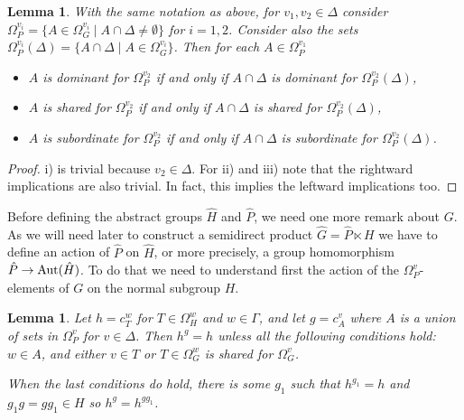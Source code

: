 \documentclass[10pt]{amsart}
\newtheorem{lemma}[theorem]{Lemma}
\theoremstyle{definition}
\newcommand{\Aut}{{\rm Aut}}
\theoremstyle{definition}
\numberwithin{equation}{section}
\begin{document}
\begin{lemma}\label{lem:intersection} With the same notation as above, for $v_1,v_2\in\Delta$ consider $\Omega_P^{v_i}=\{A\in\Omega_G^{v_i}\mid  A\cap\Delta \neq \emptyset\}$ for $i=1,2$.
Consider also the sets $\Omega_P^{v_i}(\Delta)=\{A\cap\Delta\mid A\in\Omega_G^{v_i}\}$.
 Then for each $A\in\Omega_P^{v_1}$
\begin{itemize}
\item[i)] $A$ is dominant for $\Omega_P^{v_2}$ if and only if $A\cap\Delta$ is dominant for $\Omega_P^{v_2}(\Delta)$,

\item[ii)]  $A$ is shared for $\Omega_P^{v_2}$ if and only if $A\cap\Delta$ is shared for $\Omega_P^{v_2}(\Delta)$,

\item[iii)]  $A$ is subordinate for $\Omega_P^{v_2}$ if and only if $A\cap\Delta$ is subordinate for $\Omega_P^{v_2}(\Delta)$.
\end{itemize}
\end{lemma}
\begin{proof} i) is trivial because $v_2\in\Delta$. For ii) and iii) note that the rightward implications are also trivial. In fact, this implies the leftward implications too.
\end{proof}

Before defining the abstract groups $\hat H$ and $\hat P$, we need one more remark about $G$. As we will need later to construct a semidirect product $\hat G=\hat P\ltimes H$  we have to define an action of $\hat P$ on $\hat H$, or more precisely, a group homomorphism $\hat P\to\Aut(\hat H)$. To do that we need to understand first the action of the $\Omega_P^v$-elements of $G$ on the normal subgroup $H$.

\begin{lemma} Let $h=c^w_T$ for $T\in\Omega^w_H$ and $w\in\Gamma$, and let $g=c^v_ A$ where $A$ is a union of sets in $\Omega_P^v$ for $v\in\Delta$. Then
$h^g=h$ unless all the following conditions hold: $w\in A$, and either $v\in T$ or $T\in\Omega_G^w$ is shared for $\Omega_G^v$. 

 When the last conditions do hold, there is some $g_1$ such that $h^{g_1}=h$ and $g_1g = gg_1\in H$  so
$h^g=h^{gg_1}$. %
\end{lemma}
\end{document}
